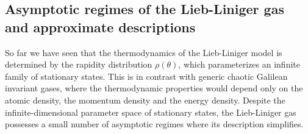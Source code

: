 \documentclass[onecolumn,amsfonts,showpacs,superscriptaddress]{revtex4-1}
\begin{document}



\subsection{Asymptotic regimes of the Lieb-Liniger gas and approximate descriptions}
\label{sec:regimes}

So far we have seen that the thermodynamics of the Lieb-Liniger model is determined by the rapidity distribution $\rho(\theta)$, which parameterizes an infinite family of stationary states. This is in contrast with  
generic chaotic Galilean invariant gases, where the thermodynamic properties would depend only on the atomic density, the momentum density and the energy density. Despite the infinite-dimensional parameter space of stationary states, the Lieb-Liniger gas possesses a small number of asymptotic regimes where its description simplifies.
\end{document}
